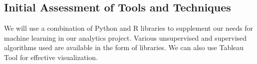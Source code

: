 \documentclass{article}
\begin{document}
\subsection{Initial Assessment of Tools and Techniques}
We will use a combination of Python and R libraries to supplement our needs for machine learning in our analytics project. Various unsupervised and supervised algorithms used are available in the form of libraries. We can also use Tableau Tool for effective visualization.
\end{document}

